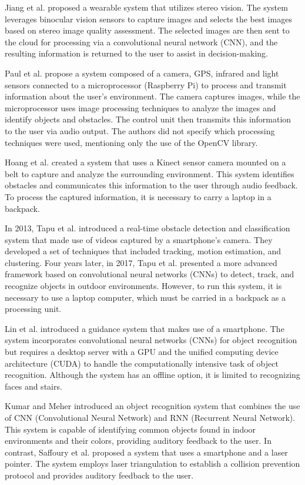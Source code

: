 \documentclass[preprint,12pt]{elsarticle}
\begin{document}
Jiang et al. \cite{jiang2019} proposed a wearable system that utilizes stereo vision. The system leverages binocular vision sensors to capture images and selects the best images based on stereo image quality assessment. The selected images are then sent to the cloud for processing via a convolutional neural network (CNN), and the resulting information is returned to the user to assist in decision-making.

Paul et al. \cite{joe2019} propose a system composed of a camera, GPS, infrared and light sensors connected to a microprocessor (Raspberry Pi) to process and transmit information about the user's environment. The camera captures images, while the microprocessor uses image processing techniques to analyze the images and identify objects and obstacles. The control unit then transmits this information to the user via audio output. The authors did not specify which processing techniques were used, mentioning only the use of the OpenCV library.

Hoang et al. \cite{hoang2017} created a system that uses a Kinect sensor camera mounted on a belt to capture and analyze the surrounding environment. This system identifies obstacles and communicates this information to the user through audio feedback. To process the captured information, it is necessary to carry a laptop in a backpack.

In 2013, Tapu et al. \cite{tapu2013} introduced a real-time obstacle detection and classification system that made use of videos captured by a smartphone's camera. They developed a set of techniques that included tracking, motion estimation, and clustering. Four years later, in 2017, Tapu et al. \cite{tapu2017} presented a more advanced framework based on convolutional neural networks (CNNs) to detect, track, and recognize objects in outdoor environments. However, to run this system, it is necessary to use a laptop computer, which must be carried in a backpack as a processing unit.

Lin et al. \cite{lin2017} introduced a guidance system that makes use of a smartphone. The system incorporates convolutional neural networks (CNNs) for object recognition but requires a desktop server with a GPU and the unified computing device architecture (CUDA) to handle the computationally intensive task of object recognition. Although the system has an offline option, it is limited to recognizing faces and stairs.

Kumar and Meher \cite{kumar2015} introduced an object recognition system that combines the use of CNN (Convolutional Neural Network) and RNN (Recurrent Neural Network). This system is capable of identifying common objects found in indoor environments and their colors, providing auditory feedback to the user. In contrast, Saffoury et al. \cite{saffoury2016} proposed a system that uses a smartphone and a laser pointer. The system employs laser triangulation to establish a collision prevention protocol and provides auditory feedback to the user.
\end{document}
